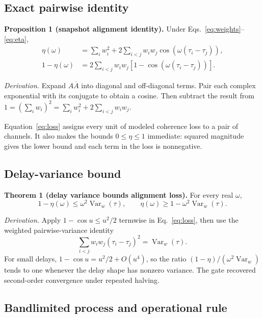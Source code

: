 \documentclass[10pt]{article}
\newcommand{\Var}{\operatorname{Var}}
\begin{document}
\subsection{Exact pairwise identity}

\textbf{Proposition 1 (snapshot alignment identity).}
Under Eqs.~\eqref{eq:weights}--\eqref{eq:eta},
\begin{align}
\eta(\omega)
&=\sum_i w_i^2+2\sum_{i<j}w_iw_j
\cos\!\left(\omega(\tau_i-\tau_j)\right),
\label{eq:pair}\\
1-\eta(\omega)
&=2\sum_{i<j}w_iw_j
\left[1-\cos\!\left(\omega(\tau_i-\tau_j)\right)\right].
\label{eq:loss}
\end{align}

\emph{Derivation.}  Expand $A\overline{A}$ into diagonal and off-diagonal
terms.  Pair each complex exponential with its conjugate to obtain a cosine.
Then subtract the result from
$1=(\sum_iw_i)^2=\sum_iw_i^2+2\sum_{i<j}w_iw_j$.

Equation~\eqref{eq:loss} assigns every unit of modeled coherence loss to a
pair of channels.  It also makes the bounds $0\le\eta\le1$ immediate: squared
magnitude gives the lower bound and each term in the loss is nonnegative.

\subsection{Delay-variance bound}

\textbf{Theorem 1 (delay variance bounds alignment loss).}
For every real $\omega$,
\begin{equation}
1-\eta(\omega)\le\omega^2\Var_w(\tau),
\qquad
\eta(\omega)\ge1-\omega^2\Var_w(\tau).
\label{eq:mainbound}
\end{equation}

\emph{Derivation.}  Apply $1-\cos u\le u^2/2$ termwise in
Eq.~\eqref{eq:loss}, then use the weighted pairwise-variance identity
\begin{equation}
\sum_{i<j}w_iw_j(\tau_i-\tau_j)^2=\Var_w(\tau).
\end{equation}
For small delays, $1-\cos u=u^2/2+O(u^4)$, so the ratio
$(1-\eta)/(\omega^2\Var_w)$ tends to one whenever the delay shape has nonzero
variance.  The gate recovered second-order convergence under repeated halving.

\subsection{Bandlimited process and operational rule}
\end{document}
